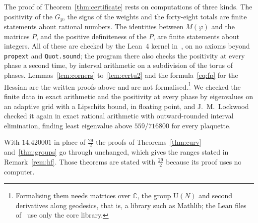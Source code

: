 \documentclass[11pt]{amsart}
\theoremstyle{definition}
\theoremstyle{remark}
\numberwithin{equation}{section}
\newcommand{\C}{\mathbb{C}}
\newcommand{\U}{\mathrm{U}}
\begin{document}
The proof of Theorem~\ref{thm:certificate} rests on computations of three
kinds. The positivity of the $G_y$, the signs of the weights and the
forty-eight totals are finite statements about rational numbers. The
identities between $M(\varphi)$ and the matrices $P$, and the positive
definiteness of the $P$, are finite statements about integers. All of
these are checked by the Lean~4 kernel in~\cite{Rom26}, on no axioms beyond
\texttt{propext} and \texttt{Quot.sound}; the program there also checks
the positivity at every phase a second time, by interval arithmetic on a
subdivision of the torus of phases. Lemmas~\ref{lem:corners}
to~\ref{lem:certu2} and the formula~\eqref{eq:fp} for the Hessian are the
written proofs above and are not formalised.\footnote{Formalising them
needs matrices over $\C$, the group $\U(N)$ and second derivatives along
geodesics, that is, a library such as Mathlib; the Lean files
of~\cite{Rom26} use only the core library.} We checked the finite data in
exact arithmetic and the positivity at every phase by eigenvalues on an
adaptive grid with a Lipschitz bound, in floating point, and
J.~M.~Lockwood checked it again in exact rational arithmetic with
outward-rounded interval elimination, finding least eigenvalue above
$559/716800$ for every plaquette.

With $14.420001$ in place of $\frac{29}2$ the proofs of
Theorems~\ref{thm:curv} and~\ref{thm:groups} go through unchanged, which
gives the ranges stated in Remark~\ref{rem:hf}. Those theorems are stated
with $\frac{29}2$ because its proof uses no computer.

\def\bibsection{\par\vskip10pt\noindent\hfil\rule{0.5\columnwidth}{0.4pt}\hfil\par\vskip8pt}
\end{document}
